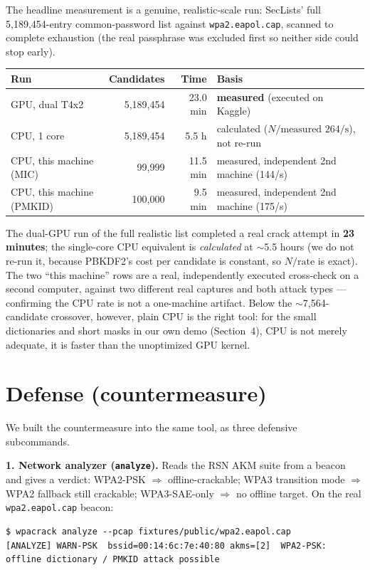 \documentclass[11pt,a4paper]{article}
\newcommand{\code}[1]{\texttt{#1}}
\begin{document}
The headline measurement is a genuine, realistic-scale run: SecLists' full 5{,}189{,}454-entry
common-password list against \code{wpa2.eapol.cap}, scanned to complete exhaustion (the real
passphrase was excluded first so neither side could stop early).

\begin{center}
\begin{tabularx}{\textwidth}{@{}l r r X@{}}
\toprule
\textbf{Run} & \textbf{Candidates} & \textbf{Time} & \textbf{Basis} \\
\midrule
GPU, dual T4x2 & 5{,}189{,}454 & 23.0 min & \textbf{measured} (executed on Kaggle) \\
CPU, 1 core    & 5{,}189{,}454 & 5.5 h    & calculated ($N/\text{measured }264\text{/s}$), not re-run \\
CPU, this machine (MIC)   & 99{,}999  & 11.5 min & measured, independent 2nd machine (144/s) \\
CPU, this machine (PMKID) & 100{,}000 & 9.5 min  & measured, independent 2nd machine (175/s) \\
\bottomrule
\end{tabularx}
\end{center}

\noindent The dual-GPU run of the full realistic list completed a real crack attempt in
\textbf{23 minutes}; the single-core CPU equivalent is \emph{calculated} at $\sim$5.5 hours (we
do not re-run it, because PBKDF2's cost per candidate is constant, so $N/\text{rate}$ is exact).
The two ``this machine'' rows are a real, independently executed cross-check on a second
computer, against two different real captures and both attack types --- confirming the CPU rate
is not a one-machine artifact. Below the $\sim$7{,}564-candidate crossover, however, plain CPU is
the right tool: for the small dictionaries and short masks in our own demo (Section~4), CPU is
not merely adequate, it is faster than the unoptimized GPU kernel.

\section{Defense (countermeasure)}
\label{sec:defense}

We built the countermeasure into the same tool, as three defensive subcommands.

\textbf{1. Network analyzer (\code{analyze}).} Reads the RSN AKM suite from a beacon and gives a
verdict: WPA2-PSK $\Rightarrow$ \textcolor{warn}{offline-crackable}; WPA3 transition mode
$\Rightarrow$ \textcolor{warn}{WPA2 fallback still crackable}; WPA3-SAE-only $\Rightarrow$
\textcolor{good}{no offline target}. On the real \code{wpa2.eapol.cap} beacon:
\begin{verbatim}
$ wpacrack analyze --pcap fixtures/public/wpa2.eapol.cap
[ANALYZE] WARN-PSK  bssid=00:14:6c:7e:40:80 akms=[2]  WPA2-PSK: offline dictionary / PMKID attack possible
\end{verbatim}
\end{document}
